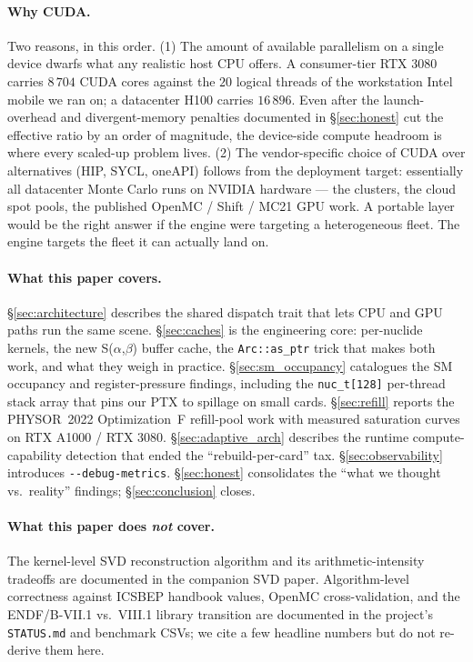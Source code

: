 \paragraph{Why CUDA.} Two reasons, in this order. (1) The amount
of available parallelism on a single device dwarfs what any
realistic host CPU offers. A consumer-tier RTX 3080 carries
$8\,704$ CUDA cores against the $20$ logical threads of the
workstation Intel mobile we ran on; a datacenter H100 carries
$16\,896$. Even after the launch-overhead and divergent-memory
penalties documented in §\ref{sec:honest} cut the effective ratio
by an order of magnitude, the device-side compute headroom is
where every scaled-up problem lives. (2) The vendor-specific
choice of CUDA over alternatives (HIP, SYCL, oneAPI) follows from
the deployment target: essentially all datacenter Monte Carlo
runs on NVIDIA hardware --- the clusters, the cloud spot pools,
the published OpenMC / Shift / MC21 GPU work. A portable layer
would be the right answer if the engine were targeting a
heterogeneous fleet. The engine targets the fleet it can
actually land on.

\paragraph{What this paper covers.} §\ref{sec:architecture}
describes the shared dispatch trait that lets CPU and GPU paths run
the same scene. §\ref{sec:caches} is the engineering core:
per-nuclide kernels, the new S($\alpha$,$\beta$) buffer cache, the
\texttt{Arc::as\_ptr} trick that makes both work, and what they
weigh in practice. §\ref{sec:sm_occupancy} catalogues the SM
occupancy and register-pressure findings, including the
\texttt{nuc\_t[128]} per-thread stack array that pins our PTX to
spillage on small cards. §\ref{sec:refill} reports the
PHYSOR~2022 Optimization~F refill-pool work with measured
saturation curves on RTX A1000 / RTX 3080.
§\ref{sec:adaptive_arch} describes the runtime
compute-capability detection that ended the
``rebuild-per-card'' tax. §\ref{sec:observability} introduces
\texttt{-{}-debug-metrics}. §\ref{sec:honest} consolidates the
``what we thought vs.\ reality'' findings; §\ref{sec:conclusion}
closes.

\paragraph{What this paper does \emph{not} cover.} The kernel-level
SVD reconstruction algorithm and its arithmetic-intensity tradeoffs
are documented in the companion SVD paper. Algorithm-level
correctness against ICSBEP handbook values, OpenMC cross-validation,
and the ENDF/B-VII.1 vs.\ VIII.1 library transition are documented
in the project's \texttt{STATUS.md} and benchmark CSVs; we cite a
few headline numbers but do not re-derive them here.
